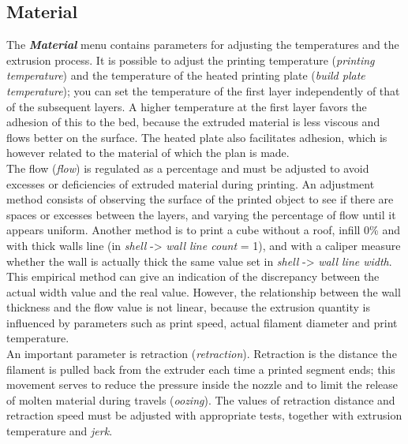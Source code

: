 \subsection{Material}
The \emph{\textbf{Material}} menu contains parameters for adjusting the temperatures and the extrusion process.
It is possible to adjust the printing temperature (\emph{printing temperature}) and the temperature of the heated printing plate (\emph{build plate temperature}); you can set the temperature of the first layer independently of that of the subsequent layers. A higher temperature at the first layer favors the adhesion of this to the bed, because the extruded material is less viscous and flows better on the surface. The heated plate also facilitates adhesion, which is however related to the material of which the plan is made.\\
The flow (\emph{flow}) is regulated as a percentage and must be adjusted to avoid excesses or deficiencies of extruded material during printing. An adjustment method consists of observing the surface of the printed object to see if there are spaces or excesses between the layers, and varying the percentage of flow until it appears uniform. Another method is to print a cube without a roof, infill 0\% and with thick walls line (in \emph{shell} -> \emph{wall line count} = 1), and with a caliper measure whether the wall is actually thick the same value set in \emph{shell} -> \emph{wall line width}.
This empirical method can give an indication of the discrepancy between the actual width value and the real value. However, the relationship between the wall thickness and the flow value is not linear, because the extrusion quantity is influenced by parameters such as print speed, actual filament diameter and print temperature.\\
An important parameter is retraction (\emph{retraction}). Retraction is the distance the filament is pulled back from the extruder each time a printed segment ends; this movement serves to reduce the pressure inside the nozzle and to limit the release of molten material during travels (\emph{oozing}). The values of retraction distance and retraction speed must be adjusted with appropriate tests, together with extrusion temperature and \emph{jerk}.

